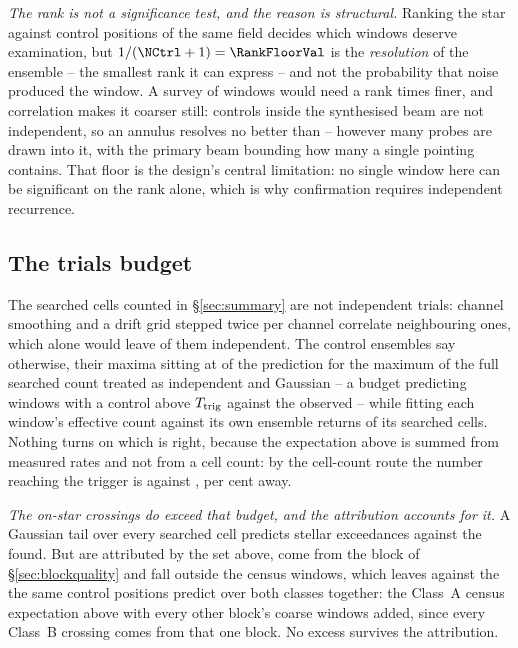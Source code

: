 \emph{The rank is not a significance test, and the reason is structural.}
Ranking the star against \NCtrl{} control positions of the same field
decides which windows deserve examination, but $1/(\NCtrl+1)=\RankFloorVal$
is the \emph{resolution} of the ensemble -- the smallest rank it can
express -- and not the probability that noise produced the window. A survey
of \NWindows{} windows would need a rank \BonfRankRatio{} times finer, and
correlation makes it coarser still: controls inside the synthesised beam are
not independent, so an annulus resolves no better than
\RankEffLo--\RankEffHi{} however many probes are drawn into it, with the
primary beam bounding how many a single pointing contains. That floor is the
design's central limitation: no single window here can be significant on the
rank alone, which is why confirmation requires independent recurrence.

\subsection{The trials budget}

The searched cells counted in \S\ref{sec:summary} are not independent
trials: channel smoothing and a drift grid stepped twice per channel
correlate neighbouring ones, which alone would leave \StGridFrac{} of them
independent. The control ensembles say otherwise, their maxima sitting at
\CtrlMaxRatioMed{} of the prediction for the maximum of the full searched
count treated as independent and Gaussian -- a budget predicting
\NCtrlWinExp{} windows with a control above $T_{\rm trig}$ against the
\NCtrlWinObs{} observed -- while fitting each window's effective count
against its own ensemble returns \StNindFrac{} of its searched cells. Nothing
turns on which is right, because the expectation above is summed from measured
rates and not from a cell count: by the cell-count route the number reaching
the trigger is \StExpModel{} against \CeExpTrig, \StModelAgreePct{} per
cent away.

\emph{The on-star crossings do exceed that budget, and the attribution
accounts for it.} A Gaussian tail over every searched cell predicts
\CellExpect{} stellar exceedances against the \NCross{} found. But \MkAttr{}
are attributed by the set above, \EvNCrossFlag{} come from the block of
\S\ref{sec:blockquality} and \CeNTailCross{} fall outside the census windows,
which leaves \CeObs{} against the \CeExpSurv{} the same control positions
predict over both classes together: the Class~A census expectation above with
every other block's coarse windows added, since every Class~B crossing comes
from that one block. No excess survives
the
attribution.

